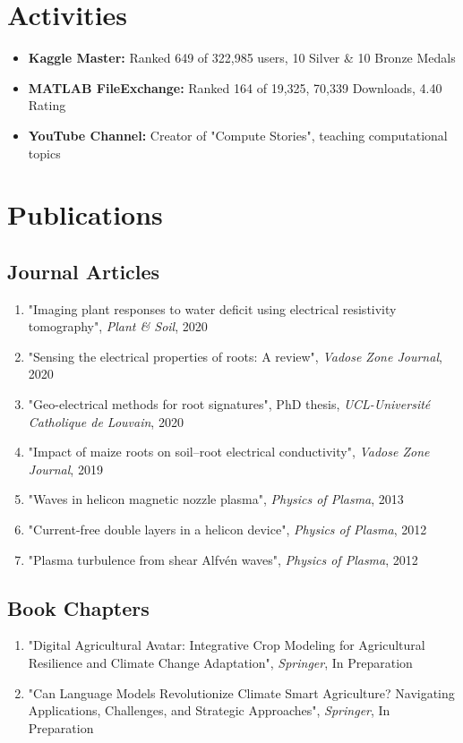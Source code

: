 \documentclass[11pt,a4paper]{article}
\begin{document}
\section*{Activities}
\begin{itemize}[leftmargin=*]
    \item \textbf{Kaggle Master:} Ranked 649 of 322,985 users, 10 Silver \& 10 Bronze Medals
    \item \textbf{MATLAB FileExchange:} Ranked 164 of 19,325, 70,339 Downloads, 4.40 Rating
    \item \textbf{YouTube Channel:} Creator of "Compute Stories", teaching computational topics
\end{itemize}

\section*{Publications}
\subsection*{Journal Articles}
\begin{enumerate}[leftmargin=*]
    \item "Imaging plant responses to water deficit using electrical resistivity tomography", \textit{Plant \& Soil}, 2020
    \item "Sensing the electrical properties of roots: A review", \textit{Vadose Zone Journal}, 2020
    \item "Geo-electrical methods for root signatures", PhD thesis, \textit{UCL-Université Catholique de Louvain}, 2020
    \item "Impact of maize roots on soil--root electrical conductivity", \textit{Vadose Zone Journal}, 2019
    \item "Waves in helicon magnetic nozzle plasma", \textit{Physics of Plasma}, 2013
    \item "Current-free double layers in a helicon device", \textit{Physics of Plasma}, 2012
    \item "Plasma turbulence from shear Alfvén waves", \textit{Physics of Plasma}, 2012
\end{enumerate}

\subsection*{Book Chapters}
\begin{enumerate}[leftmargin=*]
    \item "Digital Agricultural Avatar: Integrative Crop Modeling for Agricultural Resilience and Climate Change Adaptation", \textit{Springer}, In Preparation
    \item "Can Language Models Revolutionize Climate Smart Agriculture? Navigating Applications, Challenges, and Strategic Approaches", \textit{Springer}, In Preparation
\end{enumerate}
\end{document}

